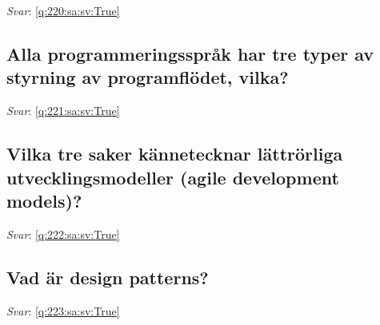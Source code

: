 \documentclass[a4paper,11pt,oneside]{article}
\begin{document}
\begin{sloppypar}
\label{q:220:sa:sv:False}

\vspace{2cm}

\noindent\makebox[\textwidth]{\hrulefill}

\vspace{1cm}

\textit{Svar}: \autoref{q:220:sa:sv:True}



\subsection{Alla programmeringsspr\r{a}k har tre typer av styrning av programfl\"odet, vilka?}

\label{q:221:sa:sv:False}

\vspace{2cm}

\noindent\makebox[\textwidth]{\hrulefill}

\vspace{1cm}

\textit{Svar}: \autoref{q:221:sa:sv:True}



\subsection{Vilka tre saker k\"annetecknar l\"attr\"orliga utvecklingsmodeller (agile development models)?}

\label{q:222:sa:sv:False}

\vspace{2cm}

\noindent\makebox[\textwidth]{\hrulefill}

\vspace{1cm}

\textit{Svar}: \autoref{q:222:sa:sv:True}



\subsection{Vad \"ar design patterns?}

\label{q:223:sa:sv:False}

\vspace{2cm}

\noindent\makebox[\textwidth]{\hrulefill}

\vspace{1cm}

\textit{Svar}: \autoref{q:223:sa:sv:True}




\end{sloppypar}
\end{document}
